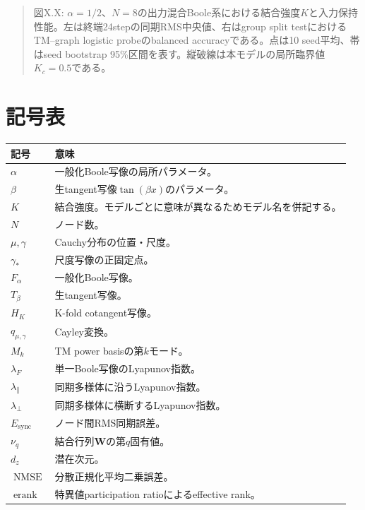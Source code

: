 \documentclass[a4paper,11pt,oneside,openany]{ltjsbook}
\newcommand{\NMSE}{\ensuremath{\operatorname{NMSE}}}
\newcommand{\effrank}{\ensuremath{\operatorname{erank}}}
\newcommand{\mat}[1]{\bm{#1}}
\begin{document}
\begin{quote}
図X.X: \(\alpha=1/2\)、\(N=8\)の出力混合Boole系における結合強度\(K\)と入力保持性能。左は終端24stepの同期RMS中央値、右はgroup split testにおけるTM--graph logistic probeのbalanced accuracyである。点は10 seed平均、帯はseed bootstrap 95\%区間を表す。縦破線は本モデルの局所臨界値\(K_c=0.5\)である。
\end{quote}

\chapter{記号表}
\label{app:symbols}

\begin{longtable}{p{28mm}p{113mm}}
\toprule
記号 & 意味 \\
\midrule
\(\alpha\) & 一般化Boole写像の局所パラメータ。\\
\(\beta\) & 生tangent写像\(\tan(\beta x)\)のパラメータ。\\
\(K\) & 結合強度。モデルごとに意味が異なるためモデル名を併記する。\\
\(N\) & ノード数。\\
\(\mu,\gamma\) & Cauchy分布の位置・尺度。\\
\(\gamma_*\) & 尺度写像の正固定点。\\
\(F_\alpha\) & 一般化Boole写像。\\
\(T_\beta\) & 生tangent写像。\\
\(H_K\) & K-fold cotangent写像。\\
\(q_{\mu,\gamma}\) & Cayley変換。\\
\(M_k\) & TM power basisの第\(k\)モード。\\
\(\lambda_F\) & 単一Boole写像のLyapunov指数。\\
\(\lambda_\parallel\) & 同期多様体に沿うLyapunov指数。\\
\(\lambda_\perp\) & 同期多様体に横断するLyapunov指数。\\
\(E_{\mathrm{sync}}\) & ノード間RMS同期誤差。\\
\(\nu_q\) & 結合行列\(\mat W\)の第\(q\)固有値。\\
\(d_z\) & 潜在次元。\\
\(\NMSE{}\) & 分散正規化平均二乗誤差。\\
\(\effrank{}\) & 特異値participation ratioによるeffective rank。\\
\bottomrule
\end{longtable}
\end{document}
